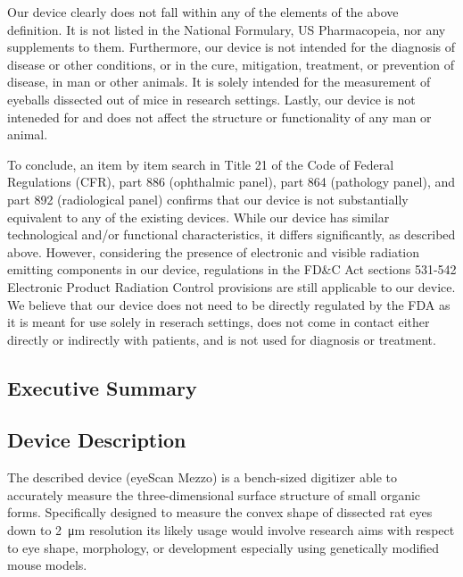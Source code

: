 \documentclass{article}
\begin{document}
Our device clearly does not fall within any of the elements of the
above definition. It is not listed in the National Formulary, US
Pharmacopeia, nor any supplements to them. Furthermore, our device is
not intended for the diagnosis of disease or other conditions, or in
the cure, mitigation, treatment, or prevention of disease, in man or
other animals. It is solely intended for the measurement of eyeballs
dissected out of mice in research settings. Lastly, our device is not
inteneded for and does not affect the structure or functionality of
any man or animal. 

To conclude, an item by item search in Title 21 of the Code of Federal
Regulations (CFR), part 886 (ophthalmic panel), part 864 (pathology
panel), and part 892 (radiological panel) confirms that our device is
not substantially equivalent to any of the existing devices. While our
device has similar technological and/or functional characteristics, it
differs significantly, as described above. However, considering the
presence of electronic and visible radiation emitting components in
our device, regulations in the FD\&C Act sections 531-542 Electronic
Product Radiation Control provisions are still applicable to our
device. We believe that our device does not need to be directly
regulated by the FDA as it is meant for use solely in reserach
settings, does not come in contact either directly or indirectly with
patients, and is not used for diagnosis or treatment. 

\appendix









\newpage
\setcounter{subsection}{0}
\subsection{Executive Summary}
\subsection{Device Description}

The described device (eyeScan Mezzo) is a bench-sized digitizer able
to accurately measure the three-dimensional surface structure of small
organic forms. Specifically designed to measure the convex shape of
dissected rat eyes down to \SI{2}{\micro m} resolution its likely
usage would involve research aims with respect to eye shape,
morphology, or development especially using genetically modified mouse
models.
\end{document}
